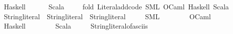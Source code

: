 \begin{isabellebody}
\ \ \ \ \ {\isacharparenleft}{\kern0pt}Haskell{\isacharparenright}{\kern0pt}\ {\isachardoublequoteopen}{\isachardoublequote}{\kern0pt}{\isachardoublequote}{\kern0pt}{\isachardoublequoteclose}\isanewline
\ \ \ \ \ {\isacharparenleft}{\kern0pt}Scala{\isacharparenright}{\kern0pt}\ {\isachardoublequoteopen}{\isachardoublequote}{\kern0pt}{\isachardoublequote}{\kern0pt}{\isachardoublequoteclose}\isanewline
%
\isadelimML
\isanewline
%
\endisadelimML
%
\isatagML
{}\isamarkupfalse%
\ {\isacartoucheopen}\isanewline
\ \ fold\ Literal{\isachardot}{\kern0pt}add{\isacharunderscore}{\kern0pt}code\ {\isacharbrackleft}{\kern0pt}{\isachardoublequote}{\kern0pt}SML{\isachardoublequote}{\kern0pt}{\isacharcomma}{\kern0pt}\ {\isachardoublequote}{\kern0pt}OCaml{\isachardoublequote}{\kern0pt}{\isacharcomma}{\kern0pt}\ {\isachardoublequote}{\kern0pt}Haskell{\isachardoublequote}{\kern0pt}{\isacharcomma}{\kern0pt}\ {\isachardoublequote}{\kern0pt}Scala{\isachardoublequote}{\kern0pt}{\isacharbrackright}{\kern0pt}\isanewline
{\isacartoucheclose}%
\endisatagML
{\isafoldML}%
%
\isadelimML
\isanewline
%
\endisadelimML
\isanewline
{}\isamarkupfalse%
\isanewline
\ \ \ {\isachardoublequoteopen}{\isacharparenleft}{\kern0pt}{\isacharplus}{\kern0pt}{\isacharparenright}{\kern0pt}\ {\isacharcolon}{\kern0pt}{\isacharcolon}{\kern0pt}\ String{\isachardot}{\kern0pt}literal\ {\isasymRightarrow}\ String{\isachardot}{\kern0pt}literal\ {\isasymRightarrow}\ String{\isachardot}{\kern0pt}literal{\isachardoublequoteclose}\ {\isasymrightharpoonup}\isanewline
\ \ \ \ {\isacharparenleft}{\kern0pt}SML{\isacharparenright}{\kern0pt}\ \ {}{}\ {\isachardoublequoteopen}{\isacharcircum}{\kern0pt}{\isachardoublequoteclose}\isanewline
\ \ \ \ \ {\isacharparenleft}{\kern0pt}OCaml{\isacharparenright}{\kern0pt}\ \ {}\ {\isachardoublequoteopen}{\isacharcircum}{\kern0pt}{\isachardoublequoteclose}\isanewline
\ \ \ \ \ {\isacharparenleft}{\kern0pt}Haskell{\isacharparenright}{\kern0pt}\ \ {}\ {\isachardoublequoteopen}{\isacharplus}{\kern0pt}{\isacharplus}{\kern0pt}{\isachardoublequoteclose}\isanewline
\ \ \ \ \ {\isacharparenleft}{\kern0pt}Scala{\isacharparenright}{\kern0pt}\ \ {}\ {\isachardoublequoteopen}{\isacharplus}{\kern0pt}{\isachardoublequoteclose}\isanewline
{\isacharbar}{\kern0pt}\ \ String{\isachardot}{\kern0pt}literal{\isacharunderscore}{\kern0pt}of{\isacharunderscore}{\kern0pt}asciis\ {\isasymrightharpoonup}\isanewline

\end{isabellebody}
